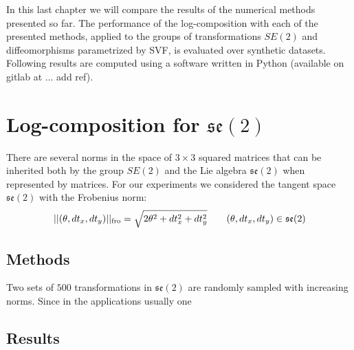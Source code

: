 In this last chapter we will compare the results of the numerical methods presented so far.
The performance of the log-composition with each of the presented methods, applied to the groups of transformations $SE(2)$ and diffeomorphisms parametrized by SVF, is evaluated over synthetic datasets.\\
Following results are computed using a software written in Python (available on gitlab at ... add ref).

\section{Log-composition for $\mathfrak{se}(2)$}

There are several norms in the space of $3\times 3$ squared matrices that can be inherited both by the group $SE(2)$ and the Lie algebra $\mathfrak{se}(2)$ when represented by matrices. For our experiments we considered the tangent space $\mathfrak{se}(2)$ with the Frobenius norm:
\begin{align*}
\vert\lvert (\theta,dt_{x},dt_{y}) \rvert\vert_{\text{fro}} = \sqrt{2\theta^{2} + dt_{x}^2 + dt_{y}^2} 
\qquad
(\theta,dt_{x},dt_{y}) \in \mathfrak{se}(2)
\end{align*}

\subsection{Methods}

Two sets of $500$ transformations in $\mathfrak{se}(2)$ are randomly sampled with increasing norms. Since in the applications usually one  


\subsection{Results}


